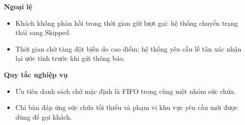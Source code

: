 \documentclass[11pt,a4paper]{article}
\begin{document}
\begin{usecasebox}[title={UC-RES-03 --- Quản lý danh sách chờ}]
    \textbf{Ngoại lệ}
    \begin{itemize}[leftmargin=1.8em]
  \item Khách không phản hồi trong thời gian giữ lượt gọi: hệ thống chuyển trạng thái sang \textsf{Skipped}.
  \item Thời gian chờ tăng đột biến do cao điểm: hệ thống yêu cầu lễ tân xác nhận lại ước tính trước khi gửi thông báo.
\end{itemize}

    \textbf{Quy tắc nghiệp vụ}
    \begin{itemize}[leftmargin=1.8em]
  \item Ưu tiên danh sách chờ mặc định là FIFO trong cùng một nhóm sức chứa.
  \item Chỉ bàn đáp ứng sức chứa tối thiểu và phạm vi khu vực yêu cầu mới được dùng để gọi khách.
\end{itemize}
    \end{usecasebox}
\end{document}
